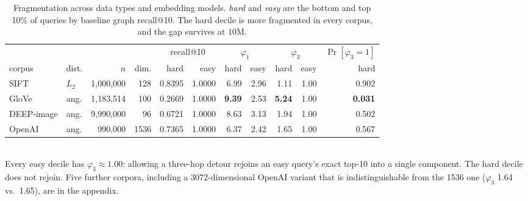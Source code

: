 \begin{table}[t]
  \caption{Fragmentation across data types and embedding models. \emph{hard} and
           \emph{easy} are the bottom and top 10\% of queries by baseline graph
           recall@10. The hard decile is more fragmented in every corpus, and the
           gap survives at $10$M.}
  \label{tab:coverage}
  \small
  \setlength{\tabcolsep}{3.5pt}
  \begin{tabular}{llrrrrrrrrr}
    \toprule
    & & & & \multicolumn{2}{c}{recall@10} & \multicolumn{2}{c}{$\varphi_1$}
        & \multicolumn{2}{c}{$\varphi_3$} & $\Pr[\varphi_3{=}1]$ \\
    \cmidrule(lr){5-6}\cmidrule(lr){7-8}\cmidrule(lr){9-10}\cmidrule(lr){11-11}
    corpus & dist. & $n$ & dim. & hard & easy & hard & easy & hard & easy & hard \\
    \midrule
    SIFT       & $L_2$ & 1{,}000{,}000 &  128 & 0.8395 & 1.0000 & 6.99 & 2.96 & 1.11 & 1.00 & 0.902 \\
    GloVe      & ang.  & 1{,}183{,}514 &  100 & 0.2669 & 1.0000 & \textbf{9.39} & 2.53 & \textbf{5.24} & 1.00 & \textbf{0.031} \\
    DEEP-image & ang.  & 9{,}990{,}000 &   96 & 0.6721 & 1.0000 & 8.63 & 3.13 & 1.94 & 1.00 & 0.502 \\
    OpenAI     & ang.  &   990{,}000 & 1536 & 0.7365 & 1.0000 & 6.37 & 2.42 & 1.65 & 1.00 & 0.567 \\
    \bottomrule
  \end{tabular}
  \\[2pt]
  \footnotesize
  Every easy decile has $\varphi_3 \approx 1.00$: allowing a three-hop detour rejoins
  an easy query's exact top-10 into a single component. The hard decile does not
  rejoin. Five further corpora, including a 3072-dimensional OpenAI variant that is
  indistinguishable from the 1536 one ($\varphi_3$ 1.64 vs.\ 1.65), are in the appendix.
\end{table}
